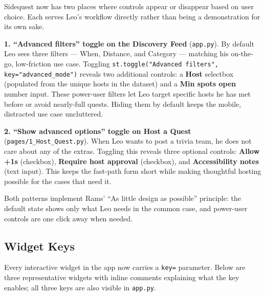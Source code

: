 \documentclass[11pt]{article}
\begin{document}
Sidequest now has two places where controls appear or disappear based on user choice. Each serves Leo's workflow directly rather than being a demonstration for its own sake.

\textbf{1. ``Advanced filters'' toggle on the Discovery Feed} (\texttt{app.py}). By default Leo sees three filters --- When, Distance, and Category --- matching his on-the-go, low-friction use case. Toggling \texttt{st.toggle("Advanced filters", key="advanced\_mode")} reveals two additional controls: a \textbf{Host} selectbox (populated from the unique hosts in the dataset) and a \textbf{Min spots open} number input. These power-user filters let Leo target specific hosts he has met before or avoid nearly-full quests. Hiding them by default keeps the mobile, distracted use case uncluttered.

\textbf{2. ``Show advanced options'' toggle on Host a Quest} (\texttt{pages/1\_Host\_Quest.py}). When Leo wants to post a trivia team, he does not care about any of the extras. Toggling this reveals three optional controls: \textbf{Allow +1s} (checkbox), \textbf{Require host approval} (checkbox), and \textbf{Accessibility notes} (text input). This keeps the fast-path form short while making thoughtful hosting possible for the cases that need it.

Both patterns implement Rams' ``As little design as possible'' principle: the default state shows only what Leo needs in the common case, and power-user controls are one click away when needed.

\subsection{Widget Keys}

Every interactive widget in the app now carries a \texttt{key=} parameter. Below are three representative widgets with inline comments explaining what the key enables; all three keys are also visible in \texttt{app.py}.
\end{document}
